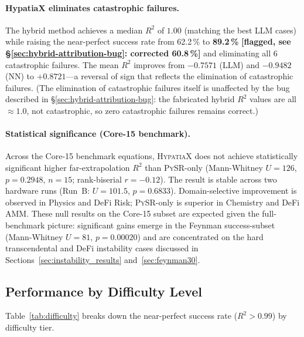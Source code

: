 \documentclass[twoside,11pt]{article}
\newcommand{\Rsq}{R^{2}}
\begin{document}
\paragraph{HypatiaX eliminates catastrophic failures.}
The hybrid method achieves a median $\Rsq$ of $1.00$ (matching the best LLM cases)
while raising the near-perfect success rate from 62.2\,\% to \textbf{89.2\,\%}
\textbf{[flagged, see \S\ref{sec:hybrid-attribution-bug}: corrected 60.8\,\%]}
and eliminating all 6 catastrophic failures.  The mean $\Rsq$ improves from
$-0.7571$ (LLM) and $-0.9482$ (NN) to $+0.8721$---a reversal of sign that reflects
the elimination of catastrophic failures. (The elimination of catastrophic
failures itself is unaffected by the bug described in
\S\ref{sec:hybrid-attribution-bug}: the fabricated hybrid $\Rsq$ values are all
$\approx 1.0$, not catastrophic, so zero catastrophic failures remains correct.)

\paragraph{Statistical significance (Core-15 benchmark).}
Across the Core-15 benchmark equations, \textsc{HypatiaX} does not achieve
statistically significant higher far-extrapolation $\Rsq$ than \textsc{PySR}-only
(Mann-Whitney $U=126$, $p=0.2948$, $n=15$; rank-biserial $r=-0.12$).  The result
is stable across two hardware runs (Run~B: $U=101.5$, $p=0.6833$).
Domain-selective improvement is observed in Physics and DeFi Risk;
\textsc{PySR}-only is superior in Chemistry and DeFi AMM.
These null results on the Core-15 subset are expected given the full-benchmark
picture: significant gains emerge in the Feynman success-subset
(Mann-Whitney $U=81$, $p=0.00020$) and are concentrated on the hard transcendental
and DeFi instability cases discussed in Sections~\ref{sec:instability_results}
and~\ref{sec:feynman30}.

\subsection{Performance by Difficulty Level}\label{subsec:performance-by-difficulty-level}
\label{sec:difficulty}

Table~\ref{tab:difficulty} breaks down the near-perfect success rate ($\Rsq > 0.99$)
by difficulty tier.
\end{document}

